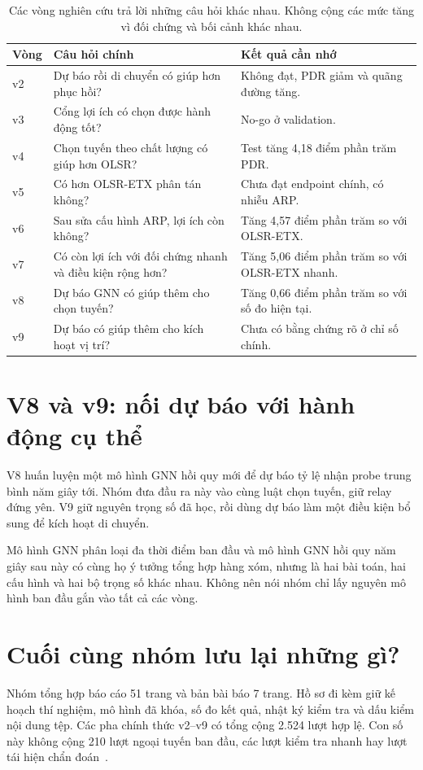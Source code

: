 \begin{table}[htbp]
\centering\small
\begin{tabularx}{\linewidth}{@{}p{14mm}YY@{}}
\toprule Vòng & Câu hỏi chính & Kết quả cần nhớ\\\midrule
v2 & Dự báo rồi di chuyển có giúp hơn phục hồi? & Không đạt, PDR giảm và quãng đường tăng.\\
v3 & Cổng lợi ích có chọn được hành động tốt? & No-go ở validation.\\
v4 & Chọn tuyến theo chất lượng có giúp hơn OLSR? & Test tăng 4,18 điểm phần trăm PDR.\\
v5 & Có hơn OLSR-ETX phân tán không? & Chưa đạt endpoint chính, có nhiễu ARP.\\
v6 & Sau sửa cấu hình ARP, lợi ích còn không? & Tăng 4,57 điểm phần trăm so với OLSR-ETX.\\
v7 & Có còn lợi ích với đối chứng nhanh và điều kiện rộng hơn? & Tăng 5,06 điểm phần trăm so với OLSR-ETX nhanh.\\
v8 & Dự báo GNN có giúp thêm cho chọn tuyến? & Tăng 0,66 điểm phần trăm so với số đo hiện tại.\\
v9 & Dự báo có giúp thêm cho kích hoạt vị trí? & Chưa có bằng chứng rõ ở chỉ số chính.\\\bottomrule
\end{tabularx}
\caption{Các vòng nghiên cứu trả lời những câu hỏi khác nhau. Không cộng các mức tăng vì đối chứng và bối cảnh khác nhau.}\label{tab:history}
\end{table}

\section{V8 và v9: nối dự báo với hành động cụ thể}
V8 huấn luyện một mô hình GNN hồi quy mới để dự báo tỷ lệ nhận probe trung bình năm giây tới. Nhóm đưa đầu ra này vào cùng luật chọn tuyến, giữ relay đứng yên. V9 giữ nguyên trọng số đã học, rồi dùng dự báo làm một điều kiện bổ sung để kích hoạt di chuyển.

Mô hình GNN phân loại đa thời điểm ban đầu và mô hình GNN hồi quy năm giây sau này có cùng họ ý tưởng tổng hợp hàng xóm, nhưng là hai bài toán, hai cấu hình và hai bộ trọng số khác nhau. Không nên nói nhóm chỉ lấy nguyên mô hình ban đầu gắn vào tất cả các vòng.

\section{Cuối cùng nhóm lưu lại những gì?}
Nhóm tổng hợp báo cáo 51 trang và bản bài báo 7 trang. Hồ sơ đi kèm giữ kế hoạch thí nghiệm, mô hình đã khóa, số đo kết quả, nhật ký kiểm tra và dấu kiểm nội dung tệp. Các pha chính thức v2--v9 có tổng cộng 2.524 lượt hợp lệ. Con số này không cộng 210 lượt ngoại tuyến ban đầu, các lượt kiểm tra nhanh hay lượt tái hiện chẩn đoán~\cite{report,repro}.


